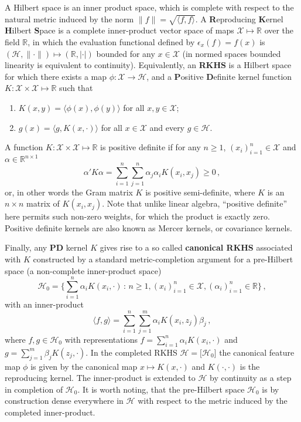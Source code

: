 \documentclass[a4paper,14pt]{extarticle}
\newcommand{\Hcal}{\mathcal{H}}
\newcommand{\Xcal}{\mathcal{X}}
\newcommand{\Real}{\mathbb{R}}
\begin{document}
A Hilbert space is an inner product space, which is complete with respect to the
natural metric induced by the norm $ \|f\| = \sqrt{\langle f, f\rangle} $. A \textbf{R}eproducing
\textbf{K}ernel \textbf{H}ilbert \textbf{S}pace is a complete inner-product vector
space of maps $\Xcal \mapsto \Real$ over the field $\Real$, in which the evaluation
functional defined by $\epsilon_x(f) = f(x)$ is $(\Hcal, \|\cdot\|) \mapsto (\Real, |\cdot|)$
bounded for any $x\in \Xcal$ (in normed spaces bounded linearity is equivalent to
continuity). Equivalently, an \textbf{RKHS} is a Hilbert space for which there exists
a map $\phi:\Xcal\to\Hcal$, and a \textbf{P}ositive \textbf{D}efinite kernel function
$K:\Xcal \times \Xcal \mapsto \Real$ such that \begin{enumerate}
  \item $K(x,y) = \langle \phi(x), \phi(y) \rangle$ for all $x, y\in \Xcal$;
  \item $g(x) = \langle g, K(x, \cdot)\rangle$ for all $x\in \Xcal$ and every
  $g\in \Hcal$.
\end{enumerate}
A function $K:\Xcal \times \Xcal \mapsto \Real$ is positive definite if for any
$n\geq1$, $(x_i)_{i=1}^n \in \Xcal$ and $\alpha \in \Real^{n\times 1}$
\begin{equation*}
  \alpha'K\alpha
    = \sum_{i=1}^n \sum_{j=1}^n \alpha_j \alpha_i K(x_i, x_j)
    \geq 0
    \,,
\end{equation*}
or, in other words the Gram matrix $K$ is positive semi-definite, where $K$ is an
$n \times n$ matrix of $K(x_i, x_j)$. Note that unlike linear algebra, ``positive
definite'' here permits such non-zero weights, for which the product is exactly
zero. Positive definite kernels are also known as Mercer kernels, or covariance
kernels.

Finally, any \textbf{PD} kernel $K$ gives rise to a so called \textbf{canonical RKHS}
associated with $K$ constructed by a standard metric-completion argument for a pre-Hilbert
space (a non-complete inner-product space)
\begin{equation*}
\Hcal_0
  = \bigl\{
    \sum_{i=1}^n \alpha_i K(x_i, \cdot)
    \,:\, n\geq1, (x_i)_{i=1}^n \in \Xcal, (\alpha_i)_{i=1}^n\in \Real
  \bigr\} \,,
\end{equation*}
with an inner-product 
\begin{equation*}
  \langle f, g \rangle = \sum_{i=1}^n \sum_{j=1}^m \alpha_i K(x_i, z_j) \beta_j \,,
\end{equation*}
where $f, g\in \Hcal_0$ with representations $f = \sum_{i=1}^n \alpha_i K(x_i, \cdot)$
and $g = \sum_{j=1}^m \beta_j K(z_j, \cdot)$. In the completed RKHS $\Hcal = \bigl[\Hcal_0\bigr]$
the canonical feature map $\phi$ is given by the canonical map $x\mapsto K(x, \cdot)$
and $K(\cdot, \cdot)$ is the reproducing kernel. The inner-product is extended to
$\Hcal$ by continuity as a step in completion of $\Hcal_0$. It is worth noting, that
the pre-Hilbert space $\Hcal_0$ is by construction dense everywhere in $\Hcal$ with
respect to the metric induced by the completed inner-product.
\end{document}
